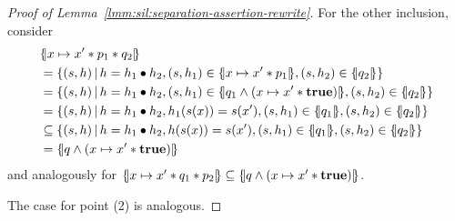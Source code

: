 \begin{proof}[Proof of Lemma~\ref{lmm:sil:separation-assertion-rewrite}]
	For the other inclusion, consider
	\begin{align*}
		 & \asldenot{x \mapsto x' \andsep p_1 \andsep q_2}                                                                                                  \\
		 & = \lbrace (s, h) \svert h = h_1 \bullet h_2, (s, h_1) \in \asldenot{x \mapsto x' \andsep p_1}, (s, h_2) \in \asldenot{q_2} \rbrace               \\
		 & = \lbrace (s, h) \svert h = h_1 \bullet h_2, (s, h_1) \in \asldenot{q_1 \land (x \mapsto x' \andsep \true)}, (s, h_2) \in \asldenot{q_2} \rbrace \\
		 & = \lbrace (s, h) \svert h = h_1 \bullet h_2, h_1(s(x)) = s(x'), (s, h_1) \in \asldenot{q_1}, (s, h_2) \in \asldenot{q_2} \rbrace                 \\
		 & \subseteq \lbrace (s, h) \svert h = h_1 \bullet h_2, h(s(x)) = s(x'), (s, h_1) \in \asldenot{q_1}, (s, h_2) \in \asldenot{q_2} \rbrace           \\
		 & = \asldenot{q \land (x \mapsto x' \andsep \true)}
	\end{align*}
	and analogously for $\{\hspace{-2pt}|x \mapsto x' * q_1 * p_2|\hspace{-2pt}\} \subseteq \{\hspace{-2pt}|q \land (x \mapsto x' * \textbf{true})|\hspace{-2pt}\}$.

	The case for point (2) is analogous.
\end{proof}

